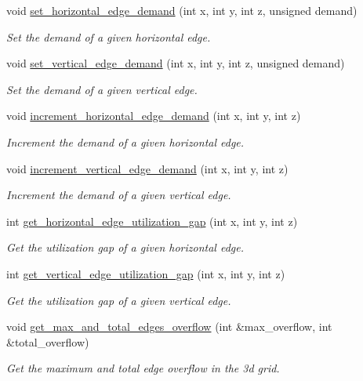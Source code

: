 \begin{DoxyCompactItemize}
void \hyperlink{classophidian_1_1routing_1_1grid__3d_ace7e530023595e4dac5b85b7d62c4f5a}{set\-\_\-horizontal\-\_\-edge\-\_\-demand} (int x, int y, int z, unsigned demand)
\begin{DoxyCompactList}\small\item\em Set the demand of a given horizontal edge. \end{DoxyCompactList}\item 
void \hyperlink{classophidian_1_1routing_1_1grid__3d_aa82edb7d55c3c84122ce47538a5361aa}{set\-\_\-vertical\-\_\-edge\-\_\-demand} (int x, int y, int z, unsigned demand)
\begin{DoxyCompactList}\small\item\em Set the demand of a given vertical edge. \end{DoxyCompactList}\item 
void \hyperlink{classophidian_1_1routing_1_1grid__3d_a98bb5e32bb6bcfa85d20e619059c0afd}{increment\-\_\-horizontal\-\_\-edge\-\_\-demand} (int x, int y, int z)
\begin{DoxyCompactList}\small\item\em Increment the demand of a given horizontal edge. \end{DoxyCompactList}\item 
void \hyperlink{classophidian_1_1routing_1_1grid__3d_a72603123c2e7e222db0086b35d570356}{increment\-\_\-vertical\-\_\-edge\-\_\-demand} (int x, int y, int z)
\begin{DoxyCompactList}\small\item\em Increment the demand of a given vertical edge. \end{DoxyCompactList}\item 
int \hyperlink{classophidian_1_1routing_1_1grid__3d_a18a17f43a95fcd44fa286a72b580c316}{get\-\_\-horizontal\-\_\-edge\-\_\-utilization\-\_\-gap} (int x, int y, int z)
\begin{DoxyCompactList}\small\item\em Get the utilization gap of a given horizontal edge. \end{DoxyCompactList}\item 
int \hyperlink{classophidian_1_1routing_1_1grid__3d_a288b490e667cc58c02f7841031bf05a6}{get\-\_\-vertical\-\_\-edge\-\_\-utilization\-\_\-gap} (int x, int y, int z)
\begin{DoxyCompactList}\small\item\em Get the utilization gap of a given vertical edge. \end{DoxyCompactList}\item 
void \hyperlink{classophidian_1_1routing_1_1grid__3d_a01a597cb2f8a82039e9aa0f9e9fc3946}{get\-\_\-max\-\_\-and\-\_\-total\-\_\-edges\-\_\-overflow} (int \&max\-\_\-overflow, int \&total\-\_\-overflow)
\begin{DoxyCompactList}\small\item\em Get the maximum and total edge overflow in the 3d grid. \end{DoxyCompactList}\end{DoxyCompactItemize}


